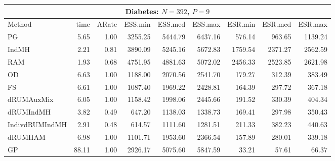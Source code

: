 \begin{table}
\begin{tabular}{l r r r r r r r r } 
\hline
\multicolumn{9}{c}{Diabetes: $N = 392$, $P=9$} \\
\hline
          Method  &     time &    ARate &  ESS.min &  ESS.med &  ESS.max &  ESR.min &  ESR.med &  ESR.max \\ 
              PG  &     5.65 &     1.00 &  3255.25 &  5444.79 &  6437.16 &   576.14 &   963.65 &  1139.24 \\ 
           IndMH  &     2.21 &     0.81 &  3890.09 &  5245.16 &  5672.83 &  1759.54 &  2371.27 &  2562.59 \\ 
             RAM  &     1.93 &     0.68 &  4751.95 &  4881.63 &  5072.02 &  2456.33 &  2523.85 &  2621.98 \\ 
              OD  &     6.63 &     1.00 &  1188.00 &  2070.56 &  2541.70 &   179.27 &   312.39 &   383.49 \\ 
              FS  &     6.61 &     1.00 &  1087.40 &  1969.22 &  2428.81 &   164.39 &   297.72 &   367.18 \\ 
      dRUMAuxMix  &     6.05 &     1.00 &  1158.42 &  1998.06 &  2445.66 &   191.52 &   330.39 &   404.34 \\ 
       dRUMIndMH  &     3.82 &     0.49 &   647.20 &  1138.03 &  1338.73 &   169.41 &   297.98 &   350.43 \\ 
  IndivdRUMIndMH  &     2.91 &     0.48 &   614.57 &  1111.60 &  1281.51 &   211.33 &   382.23 &   440.63 \\ 
         dRUMHAM  &     6.98 &     1.00 &  1101.71 &  1953.60 &  2366.54 &   157.89 &   280.01 &   339.18 \\ 
              GP  &    88.11 &     1.00 &  2926.17 &  5075.60 &  5847.59 &    33.21 &    57.61 &    66.37
 \end{tabular}


\end{table}
